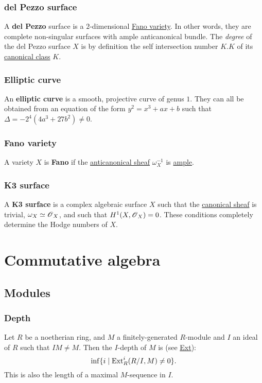\documentclass[11pt, english]{article}
\begin{document}
\subsubsection{del Pezzo surface}
\label{delpezzo}

A \textbf{del Pezzo} surface is a $2$-dimensional \hyperref[fano]{Fano variety}. In other words, they are complete non-singular surfaces with ample anticanonical bundle. The \emph{degree} of the del Pezzo surface $X$ is by definition the self intersection number $K.K$ of its \hyperref[canonicaldivisor]{canonical class} $K$. 

\subsubsection{Elliptic curve}
\label{ellipticc}

An \textbf{elliptic curve} is a smooth, projective curve of genus $1$. They can all be obtained from an equation of the form $y^2=x^3+ax+b$ such that $\Delta = -2^4(4a^3+27b^2) \neq 0$. 

\subsubsection{Fano variety}
\label{fano}

A variety $X$ is \textbf{Fano} if the \hyperref[anticanonical]{anticanonical  sheaf} $\omega_X^{-1}$ is \hyperref[amplelinebundle]{ample}.  

\subsubsection{K3 surface}
\label{k3}

A \textbf{K3 surface} is a complex algebraic surface $X$ such that the \hyperref[canonicaldivisor]{canonical sheaf} is trivial, $\omega_X \simeq \operatorname{\mathscr{O}}_X$, and such that $H^1(X,\operatorname{\mathscr{O}}_X)=0$. These conditions completely determine the Hodge numbers of $X$.


\section{Commutative algebra}
\subsection{Modules}
\subsubsection{Depth}
Let $R$ be a noetherian ring, and $M$ a finitely-generated $R$-module and $I$ an ideal of $R$ such that $IM \neq M$. Then the $I$-depth of $M$ is (see \hyperref[ext]{Ext}): \[\inf\{i \mid \operatorname{\mathrm{Ext}}^i_R(R/I,M) \neq 0\}.\]
This is also the length of a maximal $M$-sequence in $I$.
\end{document}
